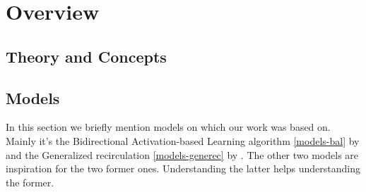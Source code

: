 



\section{Overview}

\subsection{Theory and Concepts}

 
\label{theory} 


\label{models-bp} 

\subsection{Models} %
\label{overview-models}  

In this section we briefly mention models on which our work was based on. Mainly it's the Bidirectional Activation-based Learning algorithm \ref{models-bal} by \citet{farkas2013bal} and the Generalized recirculation \ref{models-generec} by \citet{o1996bio}. The other two models are inspiration for the two former ones. Understanding the latter helps understanding the former. 










 
